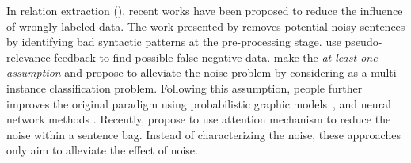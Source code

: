 In relation extraction (\RE), recent works  have been proposed to reduce the influence of wrongly labeled data.
The work presented by \cite{takamatsu2012reducing} removes potential noisy sentences by identifying bad syntactic
patterns at the pre-processing stage. \cite{xu2013filling} use pseudo-relevance feedback to find
possible false negative data. 
\cite{riedel2010modeling} make the \emph{at-least-one assumption} 
and 
propose to alleviate the noise problem by considering \RE  as a multi-instance classification problem.
Following this assumption, people further improves the original paradigm using probabilistic graphic models~\cite{hoffmann2011knowledge,surdeanu2012multi}, and neural network methods \cite{zeng2015distant}. 
Recently, \cite{lin2016neural} propose to use attention mechanism to reduce the noise within a sentence bag. 
Instead of characterizing the noise, these approaches only aim to alleviate the effect of noise. %
%


